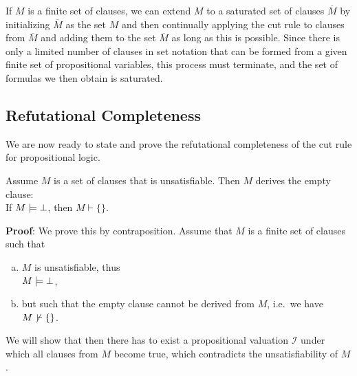 \remarkEng
If $M$ is a finite set of clauses, we can extend $M$ to a saturated set of clauses
$\overline{M}$ by initializing $\overline{M}$ as the set $M$ and then continually applying the
cut rule to clauses from $\overline{M}$ and adding them to the set $\overline{M}$ as long as this is possible.
Since there is only a limited number of clauses in set notation that can be formed from a given finite set of
propositional variables, this process must terminate, and the set of formulas we then obtain is saturated. \eox 

\subsection{Refutational Completeness}
We are now ready to state and prove the refutational completeness of the cut rule for propositional logic.

\begin{Satz}[\textcolor{blue}{Refutation Completeness}] \label{widerlegungs-vollstaendig} \hspace*{\fill} \linebreak
  Assume $M$ is a set of clauses that is unsatisfiable.  Then $M$ derives the empty clause:
  \\[0.2cm]
  \hspace*{1.3cm} 
  If $M \models \bot$, then $M \vdash \{\}$.
\end{Satz}

\noindent
\textbf{Proof}: We prove this by contraposition. Assume that $M$ is a finite set of clauses such that
\begin{enumerate}[(a)]
\item $M$ is unsatisfiable, thus
      \\[0.2cm]
      \hspace*{1.3cm}
      $M \models \bot$,
\item but such that the empty clause cannot be derived from $M$, i.e.~we have
      \\[0.2cm]
      \hspace*{1.3cm}
      $M \not\,\vdash \{\}$.
\end{enumerate}
We will show that then there has to exist a propositional valuation $\mathcal{I}$ under which all clauses
from $M$ become true, which contradicts the unsatisfiability of $M$. 


